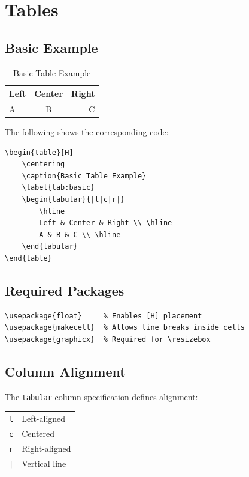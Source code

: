 \section{Tables}

\subsection{Basic Example}

\begin{table}[H]
    \centering
    \caption{Basic Table Example}
    \label{tab:basic}
    \begin{tabular}{|l|c|r|}
        \hline
        Left & Center & Right \\ \hline
        A & B & C \\ \hline
    \end{tabular}
\end{table}

The following shows the corresponding code:

\begin{verbatim}
\begin{table}[H]
    \centering
    \caption{Basic Table Example}
    \label{tab:basic}
    \begin{tabular}{|l|c|r|}
        \hline
        Left & Center & Right \\ \hline
        A & B & C \\ \hline
    \end{tabular}
\end{table}
\end{verbatim}

\subsection{Required Packages}

\begin{verbatim}
\usepackage{float}     % Enables [H] placement
\usepackage{makecell}  % Allows line breaks inside cells
\usepackage{graphicx}  % Required for \resizebox
\end{verbatim}

\subsection{Column Alignment}

The \texttt{tabular} column specification defines alignment:

\begin{center}
\begin{tabular}{ll}
\texttt{l} & Left-aligned\\
\texttt{c} & Centered\\
\texttt{r} & Right-aligned\\
\texttt{|} & Vertical line\\
\end{tabular}
\end{center}

